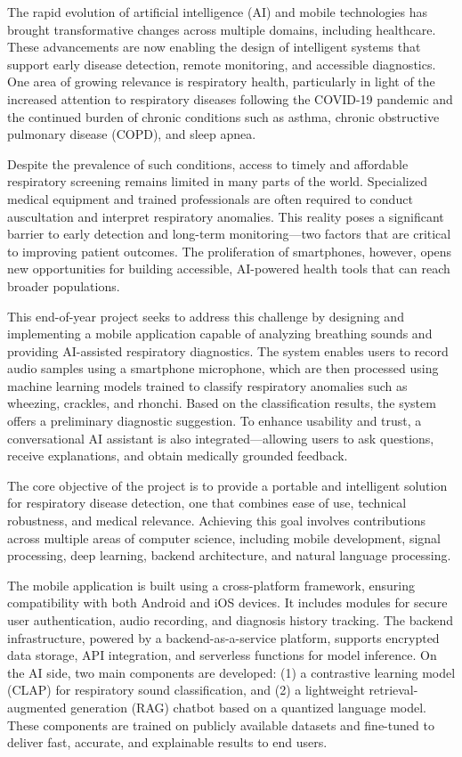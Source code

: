 
The rapid evolution of artificial intelligence (AI) and mobile technologies has brought transformative changes across multiple domains, including healthcare. These advancements are now enabling the design of intelligent systems that support early disease detection, remote monitoring, and accessible diagnostics. One area of growing relevance is respiratory health, particularly in light of the increased attention to respiratory diseases following the COVID-19 pandemic and the continued burden of chronic conditions such as asthma, chronic obstructive pulmonary disease (COPD), and sleep apnea.

Despite the prevalence of such conditions, access to timely and affordable respiratory screening remains limited in many parts of the world. Specialized medical equipment and trained professionals are often required to conduct auscultation and interpret respiratory anomalies. This reality poses a significant barrier to early detection and long-term monitoring—two factors that are critical to improving patient outcomes. The proliferation of smartphones, however, opens new opportunities for building accessible, AI-powered health tools that can reach broader populations.

This end-of-year project seeks to address this challenge by designing and implementing a mobile application capable of analyzing breathing sounds and providing AI-assisted respiratory diagnostics. The system enables users to record audio samples using a smartphone microphone, which are then processed using machine learning models trained to classify respiratory anomalies such as wheezing, crackles, and rhonchi. Based on the classification results, the system offers a preliminary diagnostic suggestion. To enhance usability and trust, a conversational AI assistant is also integrated—allowing users to ask questions, receive explanations, and obtain medically grounded feedback.

The core objective of the project is to provide a portable and intelligent solution for respiratory disease detection, one that combines ease of use, technical robustness, and medical relevance. Achieving this goal involves contributions across multiple areas of computer science, including mobile development, signal processing, deep learning, backend architecture, and natural language processing.

The mobile application is built using a cross-platform framework, ensuring compatibility with both Android and iOS devices. It includes modules for secure user authentication, audio recording, and diagnosis history tracking. The backend infrastructure, powered by a backend-as-a-service platform, supports encrypted data storage, API integration, and serverless functions for model inference. On the AI side, two main components are developed: (1) a contrastive learning model (CLAP) for respiratory sound classification, and (2) a lightweight retrieval-augmented generation (RAG) chatbot based on a quantized language model. These components are trained on publicly available datasets and fine-tuned to deliver fast, accurate, and explainable results to end users.

